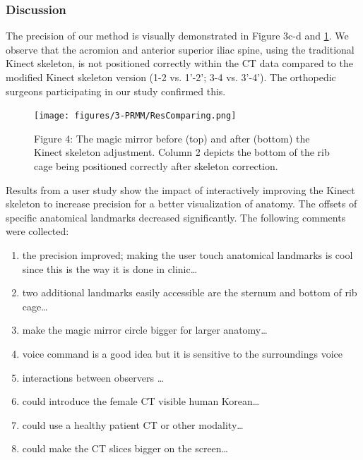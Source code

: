 \subsubsection{Discussion}
The precision of our method is visually demonstrated in Figure 3c-d and \figurename{\ref{fig:3-PRMM:ResComparing}}. We observe that the acromion and anterior superior iliac spine, using the traditional Kinect skeleton, is not positioned correctly within the CT data compared to the modified Kinect skeleton version (1-2 vs. 1'-2'; 3-4 vs. 3'-4'). The orthopedic surgeons participating in our study confirmed this.
\begin{figure}
	\centering
	\texttt{[image: figures/3-PRMM/ResComparing.png]}
	\label{fig:3-PRMM:ResComparing}
	\caption{Figure 4:	The magic mirror before (top) and after (bottom) the Kinect skeleton adjustment. Column 2 depicts the bottom of the rib cage being positioned correctly after skeleton correction.}
\end{figure}
Results from a user study show the impact of interactively improving the Kinect skeleton to increase precision for a better visualization of anatomy. The offsets of specific anatomical landmarks decreased significantly. The following comments were collected:
\begin{enumerate}
	\item the precision improved; making the user touch anatomical landmarks is cool since this is the way it is done in clinic…
	\item two additional landmarks easily accessible are the sternum and bottom of rib cage…
	\item make the magic mirror circle bigger for larger anatomy…
	\item voice command is a good idea but it is sensitive to the surroundings voice
	\item interactions between observers …
	\item could introduce the female CT visible human Korean…
	\item could use a healthy patient CT or other modality…
	\item could make the CT slices bigger on the screen…
\end{enumerate}

